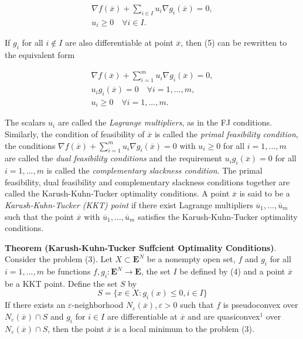 {\begin{align*}
\nabla f(\overline{x}) + \sum_{i \in I} u_{i} \nabla g_{i}(\overline{x}) = 0, \\
u_{i} \geq 0 \quad \forall i \in I.
\end{align*}

If $g_{i}$ for all $i \notin I$ are also differentiable at point $\overline{x}$, then (5) can be rewritten to the
equivalent form

\begin{align*}
\nabla f(\overline{x}) + \sum_{i = 1}^{m} u_{i} \nabla g_{i}(\overline{x}) = 0, \\
u_{i}g_{i}(\overline{x}) = 0 \quad \forall i=1,...,m,\\
u_{i} \geq 0 \quad \forall i=1,...,m.
\end{align*}

The scalars $u_{i}$ are called the \textit{Lagrange multipliers}, as in the FJ conditions. Similarly,
the condition of feasibility of $\overline{x}$ is called the \textit{primal feasibility condition}, the conditions
$\nabla f(\overline{x}) + \sum_{i=1}^{m} u_{i} \nabla g_{i}(\overline{x}) = 0$ with $u_{i} \geq 0$ for all $i = 1,...,m$ are called the \textit{dual feasibility conditions} and the requirement $u_{i}g_{i}(\overline{x}) = 0$ for all $i = 1,...,m$ is called the 
\textit{complementary slackness condition}. The primal feasibility, dual feasibility and complementary
slackness conditions together are called the Karush-Kuhn-Tucker optimality conditions.
A point $\overline{x}$ is said to be a \textit{Karush-Kuhn-Tucker (KKT) point} if there exist Lagrange
multipliers $\overline{u}_{1}, ..., \overline{u}_{m}$ such that the point $\overline{x}$ with $\overline{u}_{1}, ..., \overline{u}_{m}$ satisfies the Karush-Kuhn-Tucker optimality conditions.
\bigskip

\textbf{Theorem (Karush-Kuhn-Tucker Suffcient Optimality Conditions)}. 
Consider the problem (3). Let $X \subset \mathbf{E}^{N}$ be a nonempty open set, $f$ and $g_{i}$ for all $i = 1,...,m$ be
functions $f, g_{i}: \mathbf{E}^{N} \rightarrow \mathbf{E}$, the set $I$ be defined by (4) and a point $\overline{x}$ be a KKT point.
Define the set $S$ by
$$S = \{ x \in X: g_{i}(x) \leq 0, i \in I \} $$
If there exists an $\varepsilon $-neighborhood $N_{\varepsilon}(\overline{x}), \varepsilon > 0$ such that $f$ is pseudoconvex over $N_{\varepsilon}(\overline{x}) \cap S$
and $g_{i}$ for $i \in I$ are differentiable at $\overline{x}$ and are quasiconvex$^{1}$ over $N_{\varepsilon}(\overline{x}) \cap S$, 
then the point $\overline{x}$ is a local minimum to the problem (3).

}
